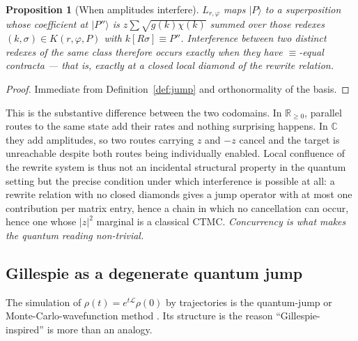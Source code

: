 \documentclass[11pt,a4paper]{article}
\theoremstyle{plain}
\newtheorem{proposition}[theorem]{Proposition}
\theoremstyle{definition}
\theoremstyle{remark}
\newcommand{\Rnn}{\mathbb{R}_{\geq 0}}
\newcommand{\Cx}{\mathbb{C}}
\newcommand{\gfac}{g}
\newcommand{\Lop}{L}
\begin{document}
\begin{proposition}[When amplitudes interfere]
\label{prop:interference}
$\Lop_{r,\varphi}$ maps $|P\rangle$ to a superposition whose coefficient at $|P''\rangle$ is
$z\sum \sqrt{\gfac(k)\chi(k)}$ summed over those redexes $(k,\sigma) \in K(r,\varphi,P)$ with
$k[R\sigma] \equiv P''$. Interference between two distinct redexes of the same class therefore
occurs exactly when they have $\equiv$-equal contracta --- that is, exactly at a closed local
diamond of the rewrite relation.
\end{proposition}

\begin{proof}
Immediate from Definition~\ref{def:jump} and orthonormality of the basis.
\end{proof}

This is the substantive difference between the two codomains. In $\Rnn$, parallel routes to the same
state add their rates and nothing surprising happens. In $\Cx$ they add amplitudes, so two routes
carrying $z$ and $-z$ cancel and the target is unreachable despite both routes being individually
enabled. Local confluence of the rewrite system is thus not an incidental structural property in the
quantum setting but the precise condition under which interference is possible at all: a rewrite
relation with no closed diamonds gives a jump operator with at most one contribution per matrix
entry, hence a chain in which no cancellation can occur, hence one whose $|z|^2$ marginal is a
classical CTMC. \emph{Concurrency is what makes the quantum reading non-trivial.}

\subsection{Gillespie as a degenerate quantum jump}

The simulation of $\rho(t) = e^{t\mathcal{L}}\rho(0)$ by trajectories is the quantum-jump or
Monte-Carlo-wavefunction method \cite{dalibard,mcwf}. Its structure is the reason ``Gillespie-inspired''
is more than an analogy.
\end{document}
